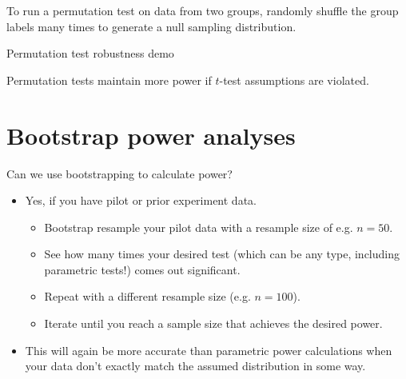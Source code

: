 \documentclass{beamer} %
\begin{document}
{

}

\begin{frame}[standout]
To run a permutation test on data from two groups, randomly shuffle the group labels many times to generate a null sampling distribution.
\end{frame}

\begin{frame}{Permutation test robustness demo}
\begin{figure}
\centering
{}
\end{figure}
\end{frame}

\begin{frame}[standout]
Permutation tests maintain more power if $t$-test assumptions are violated. \\[1em]
\end{frame}

\section{Bootstrap power analyses}

\begin{frame}{Can we use bootstrapping to calculate power?}
\begin{itemize}[<+(1)->]
\item Yes, if you have pilot or prior experiment data.
\begin{itemize}
    \item Bootstrap resample your pilot data with a resample size of e.g. $n=50$.
    \item See how many times your desired test (which can be any type, including parametric tests!) comes out significant.
    \item Repeat with a different resample size (e.g. $n=100$). 
    \item Iterate until you reach a sample size that achieves the desired power.
\end{itemize}
\item This will again be more accurate than parametric power calculations when your data don't exactly match the assumed distribution in some way.
\end{itemize}

\end{frame}
\end{document}
